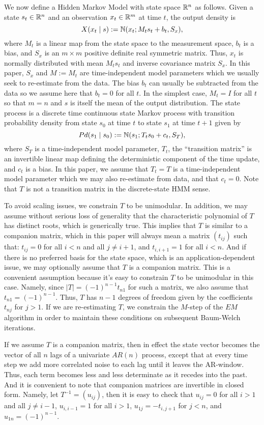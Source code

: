 \documentclass[12pt,leqno]{article}
\begin{document}
We now define a Hidden Markov Model with state space ${\mathbb R}^n$ as follows.  Given a state $s_t\in{\mathbb R}^n$ and an observation $x_t\in{\mathbb R}^m$ at time $t$, the output density is
$$
X(x_t\mid s) := {\mathbb N}(x_t;M_ts_t + b_t,S_x),
$$
where $M_t$ is a linear map from the state space to the
measurement space, $b_t$ is a bias, and $S_x$ is an $m\times{m}$ positive definite real symmetric matrix.  Thus, $x_t$
is normally distributed with mean $M_ts_t$ and inverse covariance matrix $S_x$.  In this paper, $S_x$ and $M := M_t$ are
time-independent model parameters which we usually seek to re-estimate from the data.  The bias $b_t$ can
usually be subtracted from the data so we assume here that $b_t = 0$ for all $t$. 
In the simplest case, $M_t = I$ for all $t$ so that $m = n$ and $s$ is itself the mean of the output distribution.  
The state process is a discrete time continuous state Markov process with transition probability density
from state $s_0$ at time $t$ to state $s_1$ at time $t+1$ given by
$$
Pd(s_1\mid s_0) :=  {\mathbb N}(s_1;T_ts_0+c_t,S_T),
$$
where $S_T$ is a time-independent model parameter, $T_t$, the ``transition matrix'' is an invertible linear map  
defining the deterministic component of the time update, and $c_t$ is a bias.  In this paper, we assume that
$T_t = T$ is a time-independent model parameter which we may
also re-estimate from data, and that $c_t = 0$.  Note that $T$ is not a transition matrix in the
discrete-state HMM sense.

To avoid scaling issues, we constrain $T$ to be unimodular.  In addition,  we may assume without serious loss of generality
that the characteristic polynomial of $T$ has distinct roots, which is generically true.  This implies that $T$
is similar to a companion matrix, which in this paper will always mean a matrix $(t_{ij})$ such that:
$t_{ij} = 0$ for all $i < n$ and all $j \neq i+1$, and $t_{i,i+1} = 1$ for all $i < n$.  And if there is no
preferred basis for the state space, which is an application-dependent issue,
we may optionally assume that $T$ is a companion matrix.  This is a convenient assumption because it's easy to
constrain $T$ to be unimodular in this case.  Namely,
since $|T| = (-1)^{n-1}t_{n1}$ for such a matrix, we also assume that $t_{n1} = (-1)^{n-1}$.  Thus, $T$ has $n-1$
degrees of freedom given by the coefficients $t_{nj}$ for $j > 1$.  If we are re-estimating $T$, we constrain the $M$-step
of the $EM$ algorithm in order to maintain these conditions on subsequent Baum-Welch iterations.

If we assume $T$ is a companion matrix, then in effect the state vector becomes the vector of all $n$ lags of a
univariate $AR(n)$ process, except that at every time step we add more correlated noise to each lag until it leaves
the AR-window. Thus, each term becomes less and less determinate as it recedes into the past.
And it is convenient to note that companion matrices are invertible in closed form.  Namely, let $T^{-1} = (u_{ij})$, then
it is easy to check that $u_{ij} = 0$ for all $i > 1$ and all $j\neq i-1$,
$u_{i,i-1} = 1$ for all $i > 1$, $ u_{1j} = -t_{i,j+1}$ for $j < n$, and $u_{1n} = (-1)^{n-1}$.   
\end{document}
